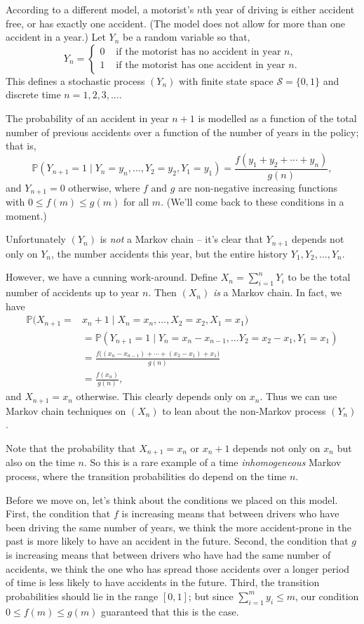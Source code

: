 \documentclass[
  a4paper,
]{article}
\theoremstyle{definition}
\theoremstyle{definition}
\theoremstyle{definition}
\theoremstyle{remark}
\begin{document}
According to a different model, a motorist's \(n\)th year of driving is either accident free, or has exactly one accident. (The model does not allow for more than one accident in a year.) Let \(Y_n\) be a random variable so that,
\[
Y_n=\begin{cases}
0&\text{ if the motorist has no accident in year $n$,}\\
1&\text{ if the motorist has one accident in year $n$.}
\end{cases}
\]
This defines a stochastic process \((Y_n)\) with finite state space \(\mathcal{S}=\{0,1\}\) and discrete time \(n = 1,2,3,\dots\).

The probability of an accident in year \(n+1\) is modelled as a function of the total number of previous accidents over a function of the number of years in the policy; that is,
\[
\mathbb P(Y_{n+1}= 1 \mid Y_n=y_{n},\dots ,Y_2=y_{2},Y_1=y_{1} )=\frac{f(y_1+y_2+\cdots +y_n)}{g(n)},
\]
and \(Y_{n+1} = 0\) otherwise,
where \(f\) and \(g\) are non-negative increasing functions with \(0\leq f(m)\leq g(m)\) for all \(m\). (We'll come back to these conditions in a moment.)

Unfortunately \((Y_n)\) is \emph{not} a Markov chain -- it's clear that \(Y_{n+1}\) depends not only on \(Y_n\), the number accidents this year, but the entire history \(Y_1, Y_2, \dots, Y_n\).

However, we have a cunning work-around. Define \(X_n=\sum_{i=1}^n Y_i\) to be the total number of accidents up to year \(n\). Then \((X_n)\) \emph{is} a Markov chain. In fact, we have
\begin{align*}
    \mathbb P(X_{n+1}={}&{}x_{n}+1\mid X_n=x_n, \dots, X_2=x_2, X_1=x_1)\\
    &=\mathbb P(Y_{n+1}=1\mid Y_n=x_n - x_{n-1}, \dots Y_2=x_2-x_1, Y_1=x_1)\\
    &=\frac{f\big((x_n-x_{n-1}) +\cdots +(x_2-x_1) + x_1\big)}{g(n)}\\
    &=\frac{f(x_n)}{g(n)},
\end{align*}
and \(X_{n+1} = x_n\) otherwise. This clearly depends only on \(x_n\). Thus we can use Markov chain techniques on \((X_n)\) to lean about the non-Markov process \((Y_n)\).

Note that the probability that \(X_{n+1} = x_n\) or \(x_n+ 1\) depends not only on \(x_n\) but also on the time \(n\). So this is a rare example of a time \emph{inhomogeneous} Markov process, where the transition probabilities do depend on the time \(n\).

Before we move on, let's think about the conditions we placed on this model. First, the condition that \(f\) is increasing means that between drivers who have been driving the same number of years, we think the more accident-prone in the past is more likely to have an accident in the future. Second, the condition that \(g\) is increasing means that between drivers who have had the same number of accidents, we think the one who has spread those accidents over a longer period of time is less likely to have accidents in the future. Third, the transition probabilities should lie in the range \([0,1]\); but since \(\sum_{i=1}^m y_i\leq m\), our condition \(0\leq f(m)\leq g(m)\) guaranteed that this is the case.
\end{document}
